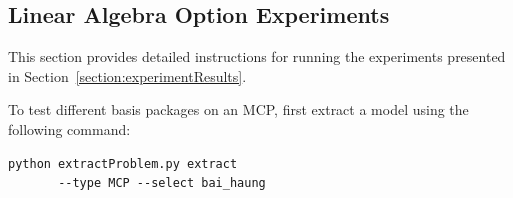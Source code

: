 \subsection{Linear Algebra Option Experiments}

This section provides detailed instructions for running the experiments presented in Section~\ref{section:experimentResults}.

To test different basis packages on an MCP, first extract a model using the following command:

\begin{verbatim}
python extractProblem.py extract 
       --type MCP --select bai_haung
\end{verbatim}

